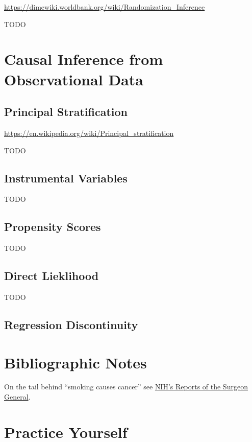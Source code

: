 \documentclass[]{book}
\theoremstyle{definition}
\theoremstyle{definition}
\theoremstyle{definition}
\theoremstyle{remark}
\begin{document}
\url{https://dimewiki.worldbank.org/wiki/Randomization_Inference}

TODO

\section{Causal Inference from Observational
Data}\label{causal-inference-from-observational-data}

\subsection{Principal Stratification}\label{principal-stratification}

\citet{frumento2012evaluating}

\url{https://en.wikipedia.org/wiki/Principal_stratification}

TODO

\subsection{Instrumental Variables}\label{instrumental-variables}

TODO

\subsection{Propensity Scores}\label{propensity-scores}

TODO

\subsection{Direct Lieklihood}\label{direct-lieklihood}

TODO

\subsection{Regression Discontinuity}\label{regression-discontinuity}

\section{Bibliographic Notes}\label{bibliographic-notes-20}

On the tail behind ``smoking causes cancer'' see
\href{https://profiles.nlm.nih.gov/ps/retrieve/Narrative/NN/p-nid/60}{NIH's
Reports of the Surgeon General}.

\section{Practice Yourself}\label{practice-yourself-20}


\end{document}
